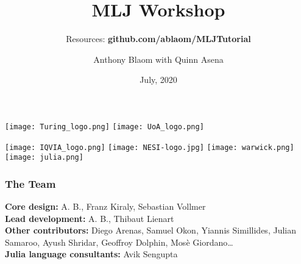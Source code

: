 \documentclass[t]{beamer}
\title{\color{Maroon} MLJ Workshop}
\subtitle{{\small Resources: \bfseries{github.com/ablaom/MLJTutorial}}}
\date{July, 2020}
\author{Anthony Blaom with Quinn Asena}
\newcommand\df{\bf\color{Maroon}}
\newcommand\dff{\bf\color{dkgreen}}
\begin{document}



\begin{frame}
        \titlepage
\end{frame}

\begin{frame}
  \vspace{0\baselineskip}
  \begin{center}
    \texttt{[image: Turing\_logo.png]}
    \texttt{[image: UoA\_logo.png]}

    \texttt{[image: IQVIA\_logo.png]}
    \texttt{[image: NESI-logo.jpg]}
    \texttt{[image: warwick.png]}
    \texttt{[image: julia.png]}
  \end{center}
\end{frame}

\begin{frame}
  \frametitle{The Team}

  {\small
    {\dff Core design:} A. B., Franz Kiraly, Sebastian Vollmer\\[1\baselineskip]

    {\dff Lead development:} A. B., Thibaut Lienart \\[1\baselineskip]

    {\dff Other contributors:} Diego Arenas, Samuel Okon, Yiannis Simillides, Julian Samaroo, Ayush Shridar, Geoffroy Dolphin, Mosè Giordano\ldots \\[1\baselineskip]

    {\dff Julia language consultants:} Avik Sengupta\\[1\baselineskip]}

\end{frame}

\end{document}
